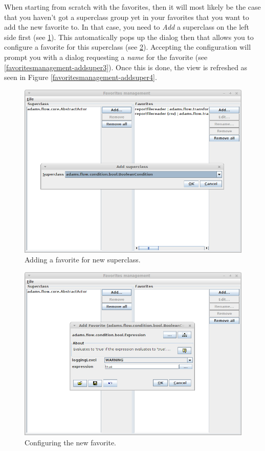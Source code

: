 \clearpage
{}
When starting from scratch with the favorites, then it will most likely be the
case that you haven't got a superclass group yet in your favorites that you want
to add the new favorite to. In that case, you need to \textit{Add} a superclass
on the left side first (see \ref{favoritesmanagement-addsuper1}). This
automatically pops up the dialog then that allows you to configure a favorite
for this superclass (see \ref{favoritesmanagement-addsuper2}). Accepting the
configuration will prompt you with a dialog requesting a \textit{name} for the
favorite (see \ref{favoritesmanagement-addsuper3}). Once this is done, the view
is refreshed as seen in Figure \ref{favoritesmanagement-addsuper4}.

\begin{figure}[htb]
  \centering
  \includegraphics[width=12.0cm]{images/favoritesmanagement-addsuper1.png}
  \caption{Adding a favorite for new superclass.}
  \label{favoritesmanagement-addsuper1}
\end{figure}

\begin{figure}[htb]
  \centering
  \includegraphics[width=12.0cm]{images/favoritesmanagement-addsuper2.png}
  \caption{Configuring the new favorite.}
  \label{favoritesmanagement-addsuper2}
\end{figure}

